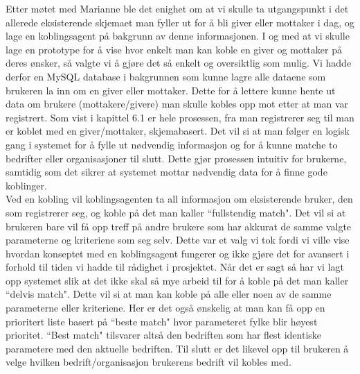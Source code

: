 Etter møtet med Marianne ble det enighet om at vi skulle ta utgangspunkt i det allerede eksisterende skjemaet man fyller ut for å bli giver eller mottaker i dag, og lage en koblingsagent på bakgrunn av denne informasjonen. I og med at vi skulle lage en prototype for å vise hvor enkelt man kan koble en giver og mottaker på deres ønsker, så valgte vi å gjøre det så enkelt og oversiktlig som mulig. Vi hadde derfor en MySQL database i bakgrunnen som kunne lagre alle dataene som brukeren la inn om en giver eller mottaker. Dette for å lettere kunne hente ut data om brukere (mottakere/givere) man skulle kobles opp mot etter at man var registrert. Som vist i kapittel 6.1 er hele prosessen, fra man registrerer seg til man er koblet med en giver/mottaker, skjemabasert. Det vil si at man følger en logisk gang i systemet for å fylle ut nødvendig informasjon og for å kunne matche to bedrifter eller organisasjoner til slutt. Dette gjør prosessen intuitiv for brukerne, samtidig som det sikrer at systemet mottar nødvendig data for å finne gode koblinger.\\

Ved en kobling vil koblingsagenten ta all informasjon om eksisterende bruker, den som registrerer seg, og koble på det man kaller ``fullstendig match". Det vil si at brukeren bare vil få opp treff på andre brukere som har akkurat de samme valgte parameterne og kriteriene som seg selv. Dette var et valg vi tok fordi vi ville vise hvordan konseptet med en koblingsagent fungerer og ikke gjøre det for avansert i forhold til tiden vi hadde til rådighet i prosjektet. Når det er sagt så har vi lagt opp systemet slik at det ikke skal så mye arbeid til for å koble på det man kaller ``delvis match". Dette vil si at man kan koble på alle eller noen av de samme parameterne eller kriteriene. Her er det også ønskelig at man kan få opp en prioritert liste basert på ``beste match" hvor parameteret fylke blir høyest prioritet. ``Best match" tilsvarer altså den bedriften som har flest identiske parametere med den aktuelle bedriften. Til slutt er det likevel opp til brukeren å velge hvilken bedrift/organisasjon brukerens bedrift vil kobles med. 
